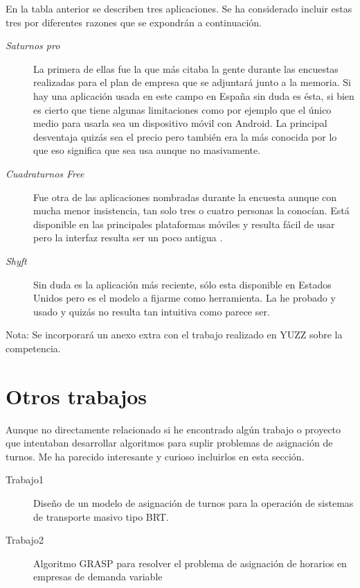 En la tabla anterior  se describen tres aplicaciones. Se ha considerado incluir estas tres  por diferentes razones que se expondrán a continuación.

\begin{description}
	\item[\emph{Saturnos pro}] La primera de ellas fue la que más citaba la gente durante las encuestas realizadas para el plan de empresa que se adjuntará junto a la memoria. Si hay una aplicación usada en este campo en España sin duda es ésta, si bien es cierto que tiene algunas limitaciones como por ejemplo que el único medio para usarla sea un dispositivo móvil con Android. La principal desventaja quizás sea el precio pero también era la más conocida por lo que eso significa que sea usa aunque no masivamente.
	\item[\emph{Cuadraturnos Free}] Fue otra de las aplicaciones nombradas durante la encuesta aunque con mucha menor insistencia, tan solo tres o cuatro personas la conocían. Está disponible en las principales plataformas móviles y resulta fácil de usar pero la interfaz resulta ser un poco antigua .
	\item[\emph{Shyft}] Sin duda es la aplicación más reciente, sólo esta disponible en Estados Unidos pero es el modelo a fijarme como herramienta. La he probado y usado y quizás no resulta tan intuitiva como parece ser.
\end{description}

Nota: Se incorporará un anexo extra con el trabajo realizado en YUZZ sobre la competencia. 

\section{Otros trabajos}
Aunque no directamente relacionado si he encontrado algún trabajo o proyecto que intentaban desarrollar algoritmos para suplir problemas de asignación de turnos. Me ha parecido interesante y curioso incluirlos en esta sección.

    \begin{description}
	\item[Trabajo1] Diseño de un modelo de asignación de turnos para la operación
de sistemas de transporte masivo tipo BRT.\cite{trabajo1}
	\item[Trabajo2]Algoritmo GRASP \citep{grasp} para resolver el problema de asignación de horarios en empresas de demanda variable \citep{trabajo2}
\end{description}

